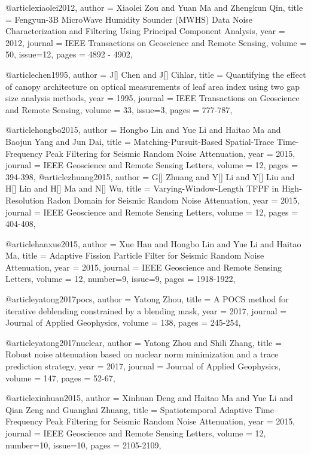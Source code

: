 @article{xiaolei2012,
  author =	 {Xiaolei Zou and Yuan Ma and Zhengkun Qin},
  title =	 {Fengyun-3B MicroWave Humidity Sounder (MWHS) Data Noise Characterization and Filtering Using Principal Component Analysis},
  year =	 2012,
  journal =	 {IEEE Transactions on Geoscience and Remote Sensing},
  volume =	 50,
  issue=12,
  pages =	 {4892 - 4902},
}

@article{chen1995,
  author =	 {J[] Chen and J[] Cihlar},
  title =	 {Quantifying the effect of canopy architecture on optical measurements of leaf area index using two gap size analysis methods},
  year =	 1995,
  journal =	 {IEEE Transactions on Geoscience and Remote Sensing},
  volume =	 33,
  issue=3,
  pages =	 {777-787},
}



@article{hongbo2015,
  author =	 {Hongbo Lin and Yue Li and Haitao Ma and Baojun Yang and Jun Dai},
  title =	 {Matching-Pursuit-Based Spatial-Trace Time-Frequency Peak Filtering for Seismic Random Noise Attenuation},
  year =	 2015,
  journal =	 {IEEE Geoscience and Remote Sensing Letters},
  volume =	 12,
  pages =	 {394-398},
}
@article{zhuang2015,
  author =	 {G[] Zhuang and Y[] Li and Y[] Liu and H[] Lin and H[] Ma and N[] Wu},
  title =	 {Varying-Window-Length {TFPF} in High-Resolution Radon Domain for Seismic Random Noise Attenuation},
  year =	 2015,
  journal =	 {IEEE Geoscience and Remote Sensing Letters},
  volume =	 12,
  pages =	 {404-408},
}

@article{hanxue2015,
  author =	 {Xue Han and Hongbo Lin and Yue Li and Haitao Ma},
  title =	 {Adaptive Fission Particle Filter for Seismic Random Noise Attenuation},
  year =	 2015,
  journal =	 {IEEE Geoscience and Remote Sensing Letters},
  volume =	 12,
  number=9,
  issue=9,
  pages =	 {1918-1922},
}

@article{yatong2017pocs,
  author =	 {Yatong Zhou},
  title =	 {A {POCS} method for iterative deblending constrained by a blending mask},
  year =	 2017,
  journal =	 {Journal of Applied Geophysics},
  volume =	 138,
  pages =	 {245-254},
}

@article{yatong2017nuclear,
  author =	 {Yatong Zhou and Shili Zhang},
  title =	 {Robust noise attenuation based on nuclear norm minimization and a trace prediction strategy},
  year =	 2017,
  journal =	 {Journal of Applied Geophysics},
  volume =	 147,
  pages =	 {52-67},
}



@article{xinhuan2015,
  author =	 {Xinhuan Deng and Haitao Ma and Yue Li and Qian Zeng and Guanghai Zhuang},
  title =	 {Spatiotemporal Adaptive Time–Frequency Peak Filtering for Seismic Random Noise Attenuation},
  year =	 2015,
  journal =	 {IEEE Geoscience and Remote Sensing Letters},
  volume =	 12,
  number=10,
  issue=10,
  pages =	 {2105-2109},
}

